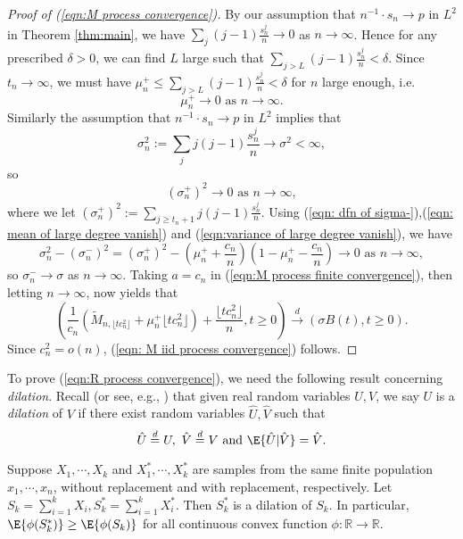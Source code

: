 \begin{proof}[Proof of (\ref{eqn:M process convergence})]
By our assumption that $n^{-1}\cdot s_n\to p$ in $L^2$ in Theorem \ref{thm:main}, we have $\sum\limits_{j}(j-1)\frac{s^j_n}{n}\to 0$ as $n\to \infty$. Hence for any prescribed $\delta>0$, we can find $L$ large such that $\sum\limits_{j>L}(j-1)\frac{s^j_n}{n}<\delta$. Since $t_n\to\infty$, we must have $\mu^+_n\le\sum\limits_{j>L}(j-1)\frac{s^j_n}{n}<\delta$ for $n$ large enough, i.e. 
\begin{equation}\label{eqn: mean of large degree vanish}
\mu^+_n\to 0 \mbox{ as } n\to\infty. 
\end{equation}
Similarly the assumption that $n^{-1}\cdot s_n\to p$ in $L^2$ implies that \[\sigma^2_n:=\sum\limits_j j(j-1)\frac{s^j_n}{n}\to\sigma^2<\infty,\] so
\begin{equation}\label{eqn:variance of large degree vanish}
(\sigma^+_n)^2\to 0 \mbox{ as } n\to\infty,
\end{equation}
where we let $(\sigma^+_n)^2:=\sum\limits_{j\ge t_n+1}j(j-1)\frac{s^j_n}{n}$.
Using (\ref{eqn: dfn of sigma-}),(\ref{eqn: mean of large degree vanish}) and (\ref{eqn:variance of large degree vanish}), we have 
\begin{equation}\label{eqn:variance convergence}
\sigma_n^2-(\sigma^-_n)^2=(\sigma^+_n)^2-(\mu^+_n+\frac{c_n}{n})(1-\mu^+_n-\frac{c_n}{n})\to 0 \mbox{ as } n\to\infty,
\end{equation}
so $\sigma^-_n\to\sigma$ as $n\to\infty$.
Taking $a=c_n$ in (\ref{eqn:M process finite convergence}), then letting $n\to\infty$, now yields that
\[\left(\frac{1}{c_n}(\tilde{M}_{n, \lfloor tc^2_n \rfloor}+\mu^+_n\lfloor tc^2_n \rfloor)+\frac{\lfloor tc^2_n \rfloor}{n}, t\ge 0 \right)\overset{d}{\to}\left(\sigma B(t), t\ge 0\right).\]
Since $c^2_n=o(n)$, (\ref{eqn: M iid process convergence}) follows.
\end{proof}

To prove (\ref{eqn:R process convergence}), we need the following result concerning \emph{dilation}. Recall (or see, e.g., \cite{Aldous1985}) that given real random variables $U, V$, we say $U$ is a \emph{dilation} of $V$ if there exist random variables $\hat{U}, \hat{V}$ such that \[\hat{U}\overset{d}{=}U,~ \hat{V}\overset{d}{=}V \mbox{ and } \E{\hat{U}|\hat{V}}=\hat{V}.\]

\begin{prop}\label{prop:dilution}
Suppose $X_1, \cdots, X_k$ and $X^\ast_1, \cdots, X^\ast_k$ are samples from the same finite population $x_1,\cdots, x_n$, without replacement and with replacement, respectively. Let $S_k=\sum\limits_{i=1}^k X_i, S^\ast_k=\sum\limits_{i=1}^k X^\ast_i$. Then $S^\ast_k$ is a dilation of $S_k$. In particular, $\E{\phi(S^\ast_k)}\ge\E{\phi(S_k)}$ for all continuous convex function $\phi:\mathbb{R}\rightarrow\mathbb{R}$.
\end{prop}


